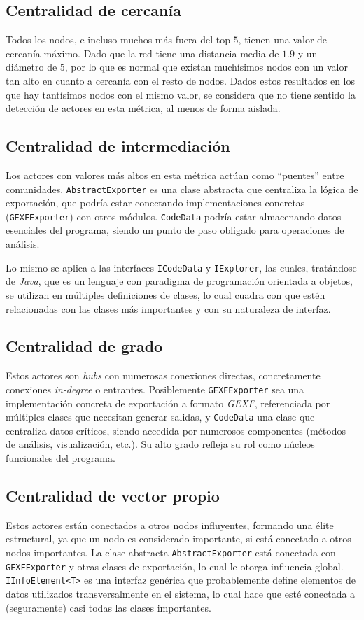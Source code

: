 \documentclass[12pt,letterpaper]{article}
\begin{document}
\subsection{Centralidad de cercanía}
Todos los nodos, e incluso muchos más fuera del top $5$, tienen una valor de cercanía máximo. Dado que la red tiene una distancia media de $1.9$ y un diámetro de $5$, por lo que es normal que existan muchísimos nodos con un valor tan alto en cuanto a cercanía con el resto de nodos. Dados estos resultados en los que hay tantísimos nodos con el mismo valor, se considera que no tiene sentido la detección de actores en esta métrica, al menos de forma aislada.

\subsection{Centralidad de intermediación}
Los actores con valores más altos en esta métrica actúan como ``puentes'' entre comunidades. \texttt{AbstractExporter} es una clase abstracta que centraliza la lógica de exportación, que podría estar conectando implementaciones concretas (\texttt{GEXFExporter}) con otros módulos. \texttt{CodeData} podría estar almacenando datos esenciales del programa, siendo un punto de paso obligado para operaciones de análisis.

Lo mismo se aplica a las interfaces \texttt{ICodeData} y \texttt{IExplorer}, las cuales, tratándose de \textit{Java}, que es un lenguaje con paradigma de programación orientada a objetos, se utilizan en múltiples definiciones de clases, lo cual cuadra con que estén relacionadas con las clases más importantes y con su naturaleza de interfaz.

\subsection{Centralidad de grado}
Estos actores son \textit{hubs} con numerosas conexiones directas, concretamente conexiones \textit{in-degree} o entrantes. Posiblemente \texttt{GEXFExporter} sea una implementación concreta de exportación a formato \textit{GEXF}, referenciada por múltiples clases que necesitan generar salidas, y \texttt{CodeData} una clase que centraliza datos críticos, siendo accedida por numerosos componentes (métodos de análisis, visualización, etc.).
Su alto grado refleja su rol como núcleos funcionales del programa.

\subsection{Centralidad de vector propio}
Estos actores están conectados a otros nodos influyentes, formando una élite estructural, ya que un nodo es considerado importante, si está conectado a otros nodos importantes. La clase abstracta \texttt{AbstractExporter} está conectada con  \texttt{GEXFExporter} y otras clases de exportación, lo cual le otorga influencia global. \texttt{IInfoElement<T>} es una interfaz genérica que probablemente define elementos de datos utilizados transversalmente en el sistema, lo cual hace que esté conectada a (seguramente) casi todas las clases importantes.
\end{document}
